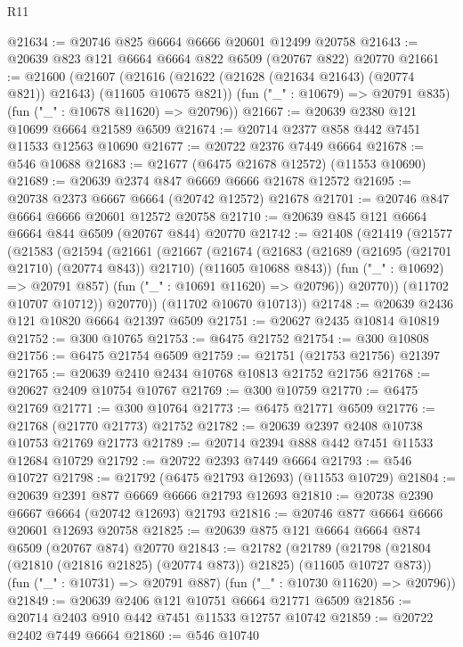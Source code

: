 \begin{lexlean}{R11}
\begin{coremodule}
{{{{{{{{{{{{{{{{{{{{{{{{{{{{{{{{{{{{{{{{{{{{{{{{{{{{{{{{{{{{{{{{{{{{{{{{{{{{{{{{{{@21634 := @20746 @825 @6664 @6666 @20601 @12499 @20758
@21643 := @20639 @823 @121 @6664 @6664 @822 @6509 (@20767 @822) @20770
@21661 := @21600
    (@21607
      (@21616 (@21622 (@21628 (@21634 @21643) (@20774 @821)) @21643) (@11605 @10675 @821))
      (fun ("_" : @10679) => @20791 @835)
      (fun ("_" : @10678 @11620) => @20796))
@21667 := @20639 @2380 @121 @10699 @6664 @21589 @6509
@21674 := @20714 @2377 @858 @442 @7451 @11533 @12563 @10690
@21677 := @20722 @2376 @7449 @6664
@21678 := @546 @10688
@21683 := @21677 (@6475 @21678 @12572) (@11553 @10690)
@21689 := @20639 @2374 @847 @6669 @6666 @21678 @12572
@21695 := @20738 @2373 @6667 @6664 (@20742 @12572) @21678
@21701 := @20746 @847 @6664 @6666 @20601 @12572 @20758
@21710 := @20639 @845 @121 @6664 @6664 @844 @6509 (@20767 @844) @20770
@21742 := @21408
    (@21419
      (@21577
        (@21583
          (@21594
            (@21661
              (@21667
                (@21674
                  (@21683
                    (@21689 (@21695 (@21701 @21710) (@20774 @843)) @21710)
                    (@11605 @10688 @843))
                  (fun ("_" : @10692) => @20791 @857)
                  (fun ("_" : @10691 @11620) => @20796))
                @20770))
            (@11702 @10707 @10712))
          @20770))
      (@11702 @10670 @10713))
@21748 := @20639 @2436 @121 @10820 @6664 @21397 @6509
@21751 := @20627 @2435 @10814 @10819
@21752 := @300 @10765
@21753 := @6475 @21752
@21754 := @300 @10808
@21756 := @6475 @21754 @6509
@21759 := @21751 (@21753 @21756) @21397
@21765 := @20639 @2410 @2434 @10768 @10813 @21752 @21756
@21768 := @20627 @2409 @10754 @10767
@21769 := @300 @10759
@21770 := @6475 @21769
@21771 := @300 @10764
@21773 := @6475 @21771 @6509
@21776 := @21768 (@21770 @21773) @21752
@21782 := @20639 @2397 @2408 @10738 @10753 @21769 @21773
@21789 := @20714 @2394 @888 @442 @7451 @11533 @12684 @10729
@21792 := @20722 @2393 @7449 @6664
@21793 := @546 @10727
@21798 := @21792 (@6475 @21793 @12693) (@11553 @10729)
@21804 := @20639 @2391 @877 @6669 @6666 @21793 @12693
@21810 := @20738 @2390 @6667 @6664 (@20742 @12693) @21793
@21816 := @20746 @877 @6664 @6666 @20601 @12693 @20758
@21825 := @20639 @875 @121 @6664 @6664 @874 @6509 (@20767 @874) @20770
@21843 := @21782
    (@21789
      (@21798 (@21804 (@21810 (@21816 @21825) (@20774 @873)) @21825) (@11605 @10727 @873))
      (fun ("_" : @10731) => @20791 @887)
      (fun ("_" : @10730 @11620) => @20796))
@21849 := @20639 @2406 @121 @10751 @6664 @21771 @6509
@21856 := @20714 @2403 @910 @442 @7451 @11533 @12757 @10742
@21859 := @20722 @2402 @7449 @6664
@21860 := @546 @10740
}}}}}}}}}}}}}}}}}}}}}}}}}}}}}}}}}}}}}}}}}}}}}}}}}}}}}}}}}}}}}}}}}}}}}}}}}}}}}}}}}}
\end{coremodule}
\end{lexlean}
